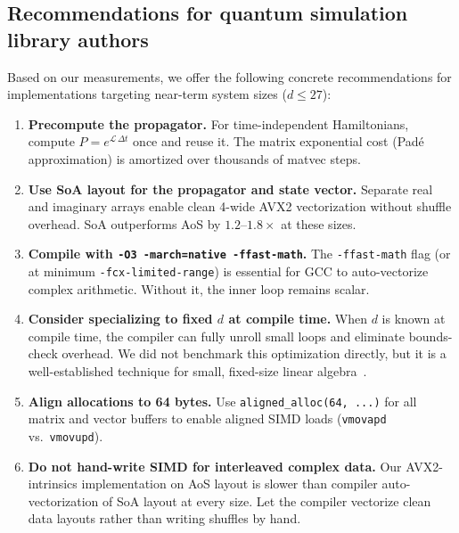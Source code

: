 \documentclass[a4paper,noarxiv]{quantumarticle}
\begin{document}
\subsection{Recommendations for quantum simulation library authors}
\label{sec:recommendations}

Based on our measurements, we offer the following concrete recommendations
for implementations targeting near-term system sizes ($d \leq 27$):

\begin{enumerate}
  \item \textbf{Precompute the propagator.}
        For time-independent Hamiltonians, compute
        $P = e^{\mathcal{L}\,\Delta t}$ once and reuse it. The matrix
        exponential cost (Pad\'{e} approximation) is amortized over
        thousands of matvec steps.

  \item \textbf{Use SoA layout for the propagator and state vector.}
        Separate real and imaginary arrays enable clean 4-wide AVX2
        vectorization without shuffle overhead. SoA outperforms AoS by
        $1.2$--$1.8\times$ at these sizes.

  \item \textbf{Compile with \texttt{-O3 -march=native -ffast-math}.}
        The \texttt{-ffast-math} flag (or at minimum
        \texttt{-fcx-limited-range}) is essential for GCC to
        auto-vectorize complex arithmetic. Without it, the inner loop
        remains scalar.

  \item \textbf{Consider specializing to fixed $d$ at compile time.}
        When $d$ is known at compile time, the compiler can fully unroll
        small loops and eliminate bounds-check overhead. We did not
        benchmark this optimization directly, but it is a well-established
        technique for small, fixed-size linear algebra~\cite{AgnerFog}.

  \item \textbf{Align allocations to 64 bytes.}
        Use \texttt{aligned\_alloc(64, ...)} for all matrix and vector
        buffers to enable aligned SIMD loads (\texttt{vmovapd} vs.\
        \texttt{vmovupd}).

  \item \textbf{Do not hand-write SIMD for interleaved complex data.}
        Our AVX2-intrinsics implementation on AoS layout is slower than
        compiler auto-vectorization of SoA layout at every size. Let the
        compiler vectorize clean data layouts rather than writing shuffles
        by hand.
\end{enumerate}
\end{document}
